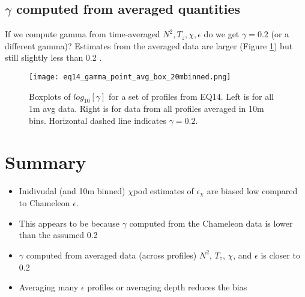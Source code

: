 \documentclass[11pt]{article}
\begin{document}
%







\clearpage
\subsection{$\gamma$ computed from averaged quantities}

If we compute gamma from time-averaged $N^2,T_z,\chi,\epsilon$ do we get $\gamma=0.2$ (or a different gamma)? Estimates from the averaged data are larger (Figure \ref{gambox_eq14}) but still slightly less than 0.2 .

\begin{figure}[htbp]
\texttt{[image: eq14\_gamma\_point\_avg\_box\_20mbinned.png]}
\caption{Boxplots of $log_{10}[\gamma]$ for a set of profiles from EQ14. Left is for all 1m avg data. Right is for data from all profiles averaged in 10m bins. Horizontal dashed line indicates $\gamma=0.2$.}
\label{gambox_eq14}
\end{figure}



\clearpage
\section{Summary}

\begin{itemize}

\item Inidivudal (and 10m binned) $\chi$pod estimates of $\epsilon_{\chi}$ are biased low compared to Chameleon $\epsilon$.

\item This appears to be because $\gamma$ computed from the Chameleon data is lower than the assumed 0.2

\item $\gamma$ computed from averaged data (across profiles) $N^2$, $T_z$, $\chi$, and $\epsilon$ is closer to 0.2

\item Averaging many $\epsilon$ profiles or averaging depth reduces the bias %

\end{itemize}

%
\end{document}
